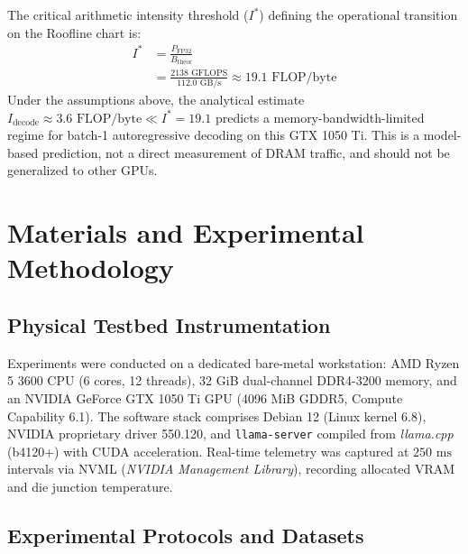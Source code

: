 \documentclass[10pt,a4paper,twocolumn]{article}
\begin{document}
The critical arithmetic intensity threshold ($I^*$) defining the operational transition on the Roofline chart is:
\begin{equation}
 \begin{aligned}
 I^* &= \frac{P_{\text{FP32}}}{B_{\text{theor}}}\\
 &= \frac{2138\text{ GFLOPS}}{112.0\text{ GB/s}} \approx 19.1\text{ FLOP/byte}
 \end{aligned}
\end{equation}
Under the assumptions above, the analytical estimate $I_{\text{decode}} \approx 3.6\text{ FLOP/byte} \ll I^* = 19.1$ predicts a memory-bandwidth-limited regime for batch-1 autoregressive decoding on this GTX 1050 Ti. This is a model-based prediction, not a direct measurement of DRAM traffic, and should not be generalized to other GPUs.

\section{Materials and Experimental Methodology}

\subsection{Physical Testbed Instrumentation}

Experiments were conducted on a dedicated bare-metal workstation: AMD Ryzen 5 3600 CPU (6 cores, 12 threads), 32 GiB dual-channel DDR4-3200 memory, and an NVIDIA GeForce GTX 1050 Ti GPU (4096 MiB GDDR5, Compute Capability 6.1). The software stack comprises Debian 12 (Linux kernel 6.8), NVIDIA proprietary driver 550.120, and \texttt{llama-server} compiled from \emph{llama.cpp} (b4120+) with CUDA acceleration. Real-time telemetry was captured at $250\text{ ms}$ intervals via NVML (\emph{NVIDIA Management Library}), recording allocated VRAM and die junction temperature.

\subsection{Experimental Protocols and Datasets}
\end{document}
